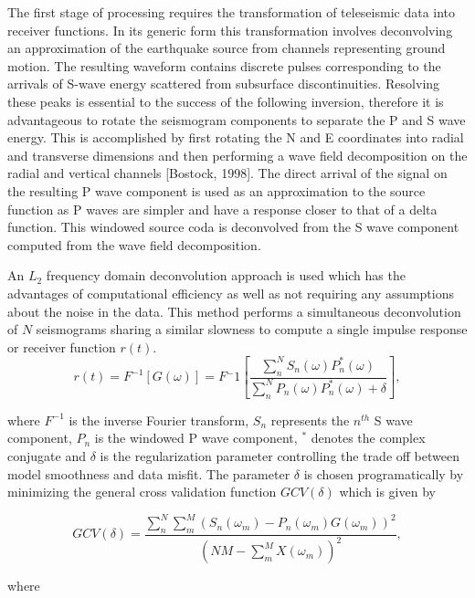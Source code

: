 \documentclass[draft, 12pt]{article}
\begin{document}
  The first stage of processing requires the transformation of teleseismic data into receiver functions. In its generic form this transformation involves deconvolving an approximation of the earthquake source from channels representing ground motion. The resulting waveform contains discrete pulses corresponding to the arrivals of S-wave energy scattered from subsurface discontinuities. Resolving these peaks is essential to the success of the following inversion, therefore it is advantageous to rotate the seismogram components to separate the P and S wave energy. This is accomplished by first rotating the N and E coordinates into radial and transverse dimensions and then performing a wave field decomposition on the radial and vertical channels [Bostock, 1998]. The direct arrival of the signal on the resulting P wave component is used as an approximation to the source function as P waves are simpler and have a response closer to that of a delta function. This windowed source coda is deconvolved from the S wave component computed from the wave field decomposition.

  An $L_2$ frequency domain deconvolution approach is used which has the advantages of computational efficiency as well as not requiring any assumptions about the noise in the data. This method performs a simultaneous deconvolution of $N$ seismograms sharing a similar slowness to compute a single impulse response or receiver function $r(t)$.
\begin{equation}
  r(t) = F^{-1} \left[ G(\omega) \right] = F{^-1}
 \left[ \frac {\sum_n^N S_n(\omega)P_n^*(\omega)} {\sum_n^N P_n(\omega)P_n^*(\omega) + \delta} \right ],
\end{equation}

where $F^{-1}$ is the inverse Fourier transform, $S_n$ represents the $n^{th}$ S wave component, $P_n$ is the windowed P wave component, $^*$ denotes the complex conjugate and $\delta$ is the regularization parameter controlling the trade off between model smoothness and data misfit. The parameter $\delta$ is chosen programatically by minimizing the general cross validation function $GCV(\delta)$ which is given by

\begin{equation}
  GCV(\delta) = \frac {\sum_n^N\sum_m^M \left( S_n(\omega_m) - P_n(\omega_m)G(\omega_m) \right)^2 }
                      { \left( NM - \sum_m^M X(\omega_m) \right)^2 },
\end{equation}

where
\end{document}
